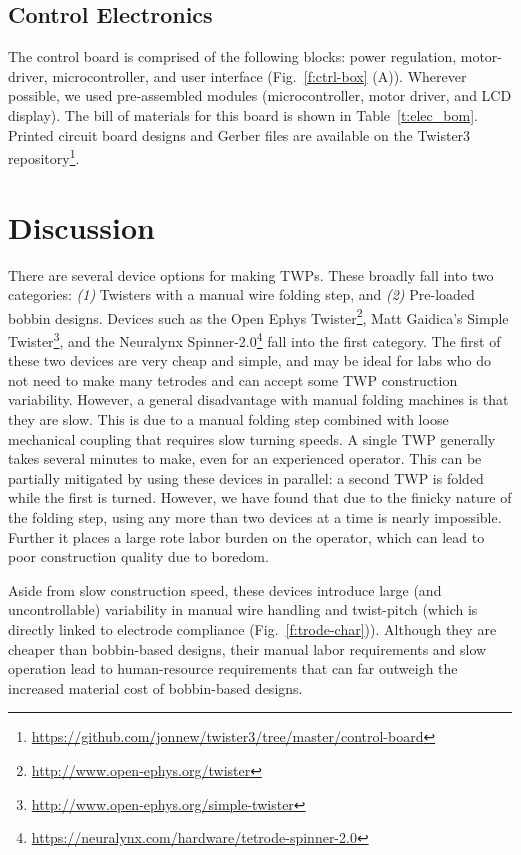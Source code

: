 \documentclass[11pt,a4paper]{article}
\begin{document}
\subsection{Control Electronics}
The control board is comprised of the following blocks: power regulation,
motor-driver, microcontroller, and user interface (Fig.~\ref{f:ctrl-box} (A)).
Wherever possible, we used pre-assembled modules (microcontroller, motor
driver, and LCD display). The bill of materials for this board is shown in
Table~\ref{t:elec_bom}. Printed circuit board designs and Gerber files are
available on the Twister3
repository\footnote{\url{https://github.com/jonnew/twister3/tree/master/control-board}}.

\section{Discussion}
There are several device options for making TWPs. These broadly fall into two
categories: \textit{(1)} Twisters with a manual wire folding step, and
\textit{(2)} Pre-loaded bobbin designs. Devices such as the Open Ephys
Twister\footnote{\url{http://www.open-ephys.org/twister}}, Matt Gaidica's
Simple Twister\footnote{\url{http://www.open-ephys.org/simple-twister}}, and
the Neuralynx
Spinner-2.0\footnote{\url{https://neuralynx.com/hardware/tetrode-spinner-2.0}}
fall into the first category. The first of these two devices are very cheap and
simple, and may be ideal for labs who do not need to make many tetrodes and can
accept some TWP construction variability. However, a general disadvantage with manual
folding machines is that they are slow. This is due to a  manual folding step
combined with loose mechanical coupling that requires slow turning speeds.  A
single TWP generally takes several minutes to make, even for an experienced
operator. This can be partially mitigated by using these devices in
parallel: a second TWP is folded while the first is turned. However, we have
found that due to the finicky nature of the folding step, using any more than
two devices at a time is nearly impossible. Further it places a large rote
labor burden on the operator, which can lead to poor construction quality due
to boredom.

Aside from slow construction speed, these devices introduce large (and
uncontrollable) variability in manual wire handling and twist-pitch (which is
directly linked to electrode compliance (Fig.~\ref{f:trode-char})). Although
they are cheaper than bobbin-based designs, their manual labor requirements and
slow operation lead to human-resource requirements that can far outweigh the
increased material cost of bobbin-based designs.
\end{document}
